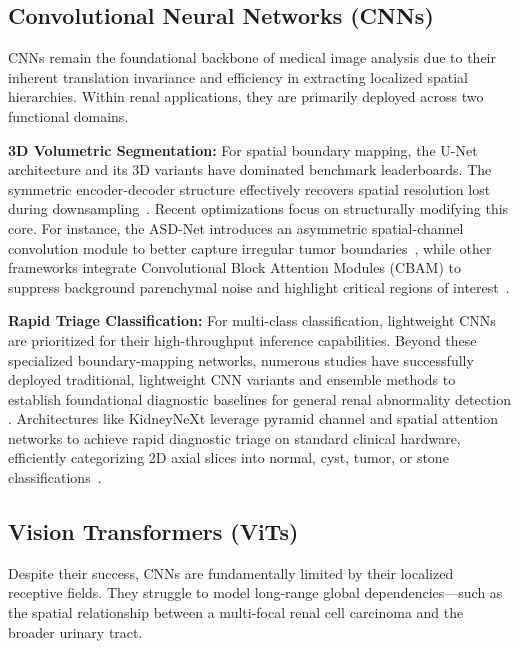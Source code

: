 \subsection{Convolutional Neural Networks (CNNs)}
CNNs remain the foundational backbone of medical image analysis due to their inherent translation invariance and efficiency in extracting localized spatial hierarchies. Within renal applications, they are primarily deployed across two functional domains.

\textbf{3D Volumetric Segmentation:} For spatial boundary mapping, the U-Net architecture and its 3D variants have dominated benchmark leaderboards. The symmetric encoder-decoder structure effectively recovers spatial resolution lost during downsampling~\cite{abdelrahman2022deep}. Recent optimizations focus on structurally modifying this core. For instance, the ASD-Net introduces an asymmetric spatial-channel convolution module to better capture irregular tumor boundaries~\cite{ji2024asdnet}, while other frameworks integrate Convolutional Block Attention Modules (CBAM) to suppress background parenchymal noise and highlight critical regions of interest~\cite{gohil2024kidney}.

\textbf{Rapid Triage Classification:} For multi-class classification, lightweight CNNs are prioritized for their high-throughput inference capabilities. Beyond these specialized boundary-mapping networks, numerous studies have successfully deployed traditional, lightweight CNN variants and ensemble methods to establish foundational diagnostic baselines for general renal abnormality detection \cite{alzubi2022kidney, bhandari2023lightweight, rathva2025ensemble, tarul2025empirical, pimpalkar2025fine, abdelrahman2023efficientnet, zhao2023automatic, chen20215d}. Architectures like KidneyNeXt leverage pyramid channel and spatial attention networks to achieve rapid diagnostic triage on standard clinical hardware, efficiently categorizing 2D axial slices into normal, cyst, tumor, or stone classifications~\cite{alqahtani2025kidneynext}.

\subsection{Vision Transformers (ViTs)}
Despite their success, CNNs are fundamentally limited by their localized receptive fields. They struggle to model long-range global dependencies—such as the spatial relationship between a multi-focal renal cell carcinoma and the broader urinary tract. 

